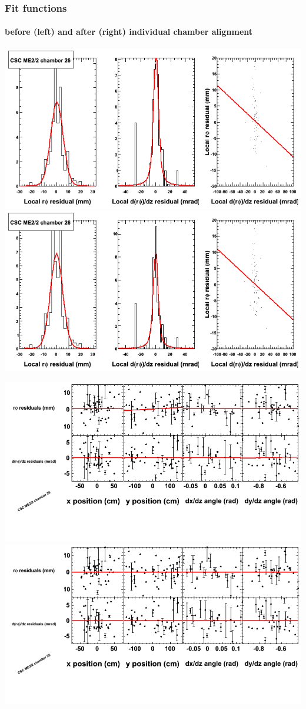 \documentclass[compress]{beamer}
\begin{document}
\begin{frame}
\frametitle{Fit functions}
\framesubtitle{before (left) and after (right) individual chamber alignment}
\includegraphics[width=0.5\linewidth]{ringfits_3dof/beforefit_MEp22_26_bellcurve.png} \includegraphics[width=0.5\linewidth]{ringfits_3dof/afterfit_MEp22_26_bellcurve.png}

\includegraphics[width=0.5\linewidth]{ringfits_3dof/beforefit_MEp22_26_polynomials.png} \includegraphics[width=0.5\linewidth]{ringfits_3dof/afterfit_MEp22_26_polynomials.png}
\end{frame}
\end{document}
